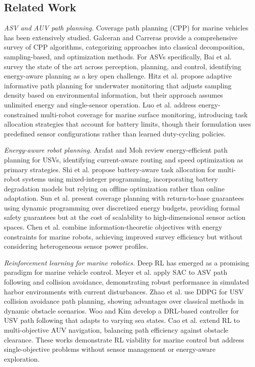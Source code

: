 \documentclass[conference]{IEEEtran}
\begin{document}
\subsection{Related Work}

\textit{ASV and AUV path planning.} Coverage path planning (CPP) for marine vehicles has been extensively studied. Galceran and Carreras \cite{Galceran2013CPPSurvey} provide a comprehensive survey of CPP algorithms, categorizing approaches into classical decomposition, sampling-based, and optimization methods. For ASVs specifically, Bai et al. \cite{Bai2022ASVSurvey} survey the state of the art across perception, planning, and control, identifying energy-aware planning as a key open challenge. Hitz et al. \cite{Hitz2017AUVCoverage} propose adaptive informative path planning for underwater monitoring that adjusts sampling density based on environmental information, but their approach assumes unlimited energy and single-sensor operation. Luo et al. \cite{Luo2024MarineCoverage} address energy-constrained multi-robot coverage for marine surface monitoring, introducing task allocation strategies that account for battery limits, though their formulation uses predefined sensor configurations rather than learned duty-cycling policies.

\textit{Energy-aware robot planning.} Arafat and Moh \cite{Arafat2023EnergyAware} review energy-efficient path planning for USVs, identifying current-aware routing and speed optimization as primary strategies. Shi et al. \cite{Shi2024BatteryAware} propose battery-aware task allocation for multi-robot systems using mixed-integer programming, incorporating battery degradation models but relying on offline optimization rather than online adaptation. Sun et al. \cite{Sun2025EnergyCPP} present coverage planning with return-to-base guarantees using dynamic programming over discretized energy budgets, providing formal safety guarantees but at the cost of scalability to high-dimensional sensor action spaces. Chen et al. \cite{Chen2025InformedCPP} combine information-theoretic objectives with energy constraints for marine robots, achieving improved survey efficiency but without considering heterogeneous sensor power profiles.

\textit{Reinforcement learning for marine robotics.} Deep RL has emerged as a promising paradigm for marine vehicle control. Meyer et al. \cite{Meyer2021SACNavigation} apply SAC to ASV path following and collision avoidance, demonstrating robust performance in simulated harbor environments with current disturbances. Zhao et al. \cite{Zhao2022DDPGASV} use DDPG for USV collision avoidance path planning, showing advantages over classical methods in dynamic obstacle scenarios. Woo and Kim \cite{Woo2023RLUUV} develop a DRL-based controller for USV path following that adapts to varying sea states. Cao et al. \cite{Cao2024MarineRL} extend RL to multi-objective AUV navigation, balancing path efficiency against obstacle clearance. These works demonstrate RL viability for marine control but address single-objective problems without sensor management or energy-aware exploration.
\end{document}
